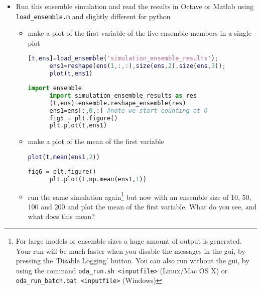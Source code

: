 \begin{itemize}
      
\item Run this ensemble simulation and read the results in Octave or
      Matlab using {\tt load\_ensemble.m} and slightly different for python
      \begin{itemize}
      \item make a plot of the first variable of the five ensemble
            members in a single plot
      \begin{lstlisting}[language=Matlab,frame=single,caption={Matlab}]
      [t,ens]=load_ensemble('simulation_ensemble_results');
      ens1=reshape(ens(1,:,:),size(ens,2),size(ens,3));
      plot(t,ens1)
      \end{lstlisting}
      \begin{lstlisting}[language=Python,frame=single,caption={Python}]
      import ensemble
      import simulation_ensemble_results as res
      (t,ens)=ensemble.reshape_ensemble(res)
      ens1=ens[:,0,:] #note we start counting at 0
      fig5 = plt.figure()
      plt.plot(t,ens1)
      \end{lstlisting}
      \item make a plot of the mean of the first variable
      \begin{lstlisting}[language=Matlab,frame=single,caption={Matlab}]
      plot(t,mean(ens1,2))
      \end{lstlisting}
      \begin{lstlisting}[language=Python,frame=single,caption={Python}]
      fig6 = plt.figure()
      plt.plot(t,np.mean(ens1,1))
      \end{lstlisting}
      \item run the same simulation again\footnote{For large models or
            ensemble sizes a huge amount of output is generated. Your
            run will be much faster when you disable the messages in
            the gui, by pressing the 'Disable Logging' button.
            You can also run without the gui, by using the command
            {\tt oda\_run.sh <inputfile>} (Linux/Mac OS X) or
            {\tt oda\_run\_batch.bat <inputfile>} (Windows)}
            but now with an ensemble size of 10, 50, 100 and 200 and
            plot the mean of the first variable. What do you see, and
            what does this mean?
      \end{itemize}
\end{itemize}
